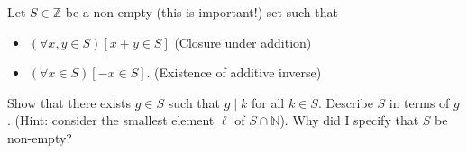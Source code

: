 Let $S \in \mathbb{Z}$ be a non-empty (this is important!) set such that 
\begin{itemize}
    \item $(\forall x, y \in S)[x + y \in S]$ (Closure under addition)
    \item $(\forall x \in S)[-x \in S]$. (Existence of additive inverse)
\end{itemize}

Show that there exists $g \in S$ such that $g \mid k$ for all $k \in S$. Describe $S$ in terms of $g$. (Hint: consider the smallest element $\ell$ of $S \cap \mathbb{N}$). Why did I specify that $S$ be non-empty?